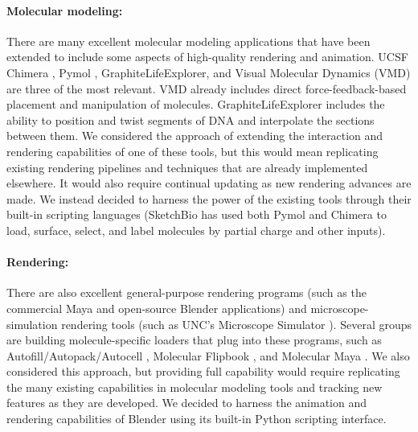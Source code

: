\documentclass[twocolumn]{bmcart}%
\begin{document}
\paragraph*{Molecular modeling:}
There are many excellent molecular modeling applications that have been extended to include some aspects of high-quality rendering and animation.  UCSF Chimera \cite{pettersen2004ucsf}, Pymol \cite{pymol2013}, GraphiteLifeExplorer\cite{hornus2013easy}, and Visual Molecular Dynamics (VMD) \cite{humphrey1996} are three of the most relevant.  VMD already includes direct force-feedback-based placement and manipulation of molecules.  GraphiteLifeExplorer includes the ability to position and twist segments of DNA and interpolate  the sections between them.  We considered the approach of extending the interaction and rendering capabilities of one of these tools, but this would mean replicating existing rendering pipelines and techniques that are already implemented elsewhere.  It would also require continual updating as new rendering advances are made.  We instead decided to harness the power of the existing tools through their built-in scripting languages (SketchBio has used both Pymol and Chimera to load, surface, select, and label molecules by partial charge and other inputs).

\paragraph*{Rendering:}
There are also excellent general-purpose rendering programs (such as the commercial Maya and open-source Blender applications) and microscope-simulation rendering tools (such as UNC's Microscope Simulator \cite{quammen2008}).  Several groups are building molecule-specific loaders that plug into these programs, such as Autofill/Autopack/Autocell \cite{Johnson2013}, Molecular Flipbook \cite{flipbook2013}, and Molecular Maya \cite{molecularmaya}.  We also considered this approach, but providing full capability would require replicating the many existing capabilities in molecular modeling tools and tracking new features as they are developed.  We decided to harness the animation and rendering capabilities of Blender using its built-in Python scripting interface.
\end{document}
